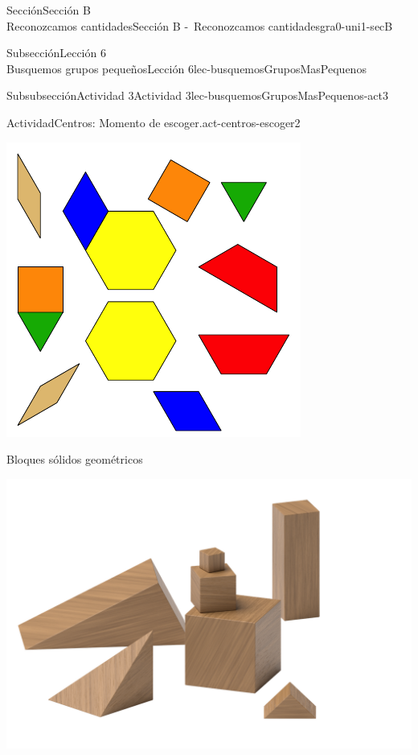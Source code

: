 \begin{sectionptx}{Sección}{{\Large Sección B\\}Reconozcamos cantidades}{}{Sección B -~Reconozcamos cantidades}{}{}{gra0-uni1-secB}
\begin{subsectionptx}{Subsección}{{\normalsize Lección 6\\[-0.05cm]}Busquemos grupos pequeños}{}{Lección 6}{}{}{lec-busquemosGruposMasPequenos}
\begin{subsubsectionptx}{Subsubsección}{Actividad 3}{}{Actividad 3}{}{}{lec-busquemosGruposMasPequenos-act3}
\begin{activity}{Actividad}{Centros: Momento de escoger.}{act-centros-escoger2}
\begin{sidebyside}{2}{0.025}{0.025}{0.05}
\begin{sbspanel}{0.45}
\includegraphics[max width=\linewidth, center]{external/svg-source/tikz-file-147344.pdf}
\end{sbspanel}%
\end{sidebyside}%
\vspace*{1ex minus 0.8ex}
\begin{sidebyside}{2}{0.025}{0.025}{0.05}%
\begin{sbspanel}{0.45}%
Bloques sólidos geométricos%
\par
\includegraphics[max width=\linewidth, center]{external/png-source/K.1.A Beta Student Workbook.Geoblocks.png}

\end{sbspanel}
\end{sidebyside}
\end{activity}
\end{subsubsectionptx}
\end{subsectionptx}
\end{sectionptx}
